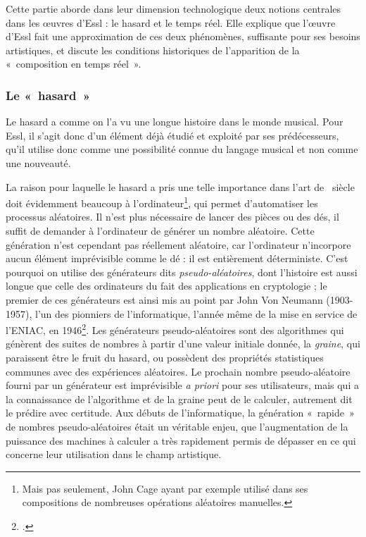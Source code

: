 \documentclass[a4paper,12pt]{article}
\newcommand{\guill}[1]{«~#1~»}
\begin{document}
Cette partie aborde dans leur dimension technologique deux notions centrales dans les œuvres d'Essl : le hasard et le temps réel. Elle explique que l'œuvre d'Essl fait une approximation de ces deux phénomènes, suffisante pour ses besoins artistiques, et discute les conditions historiques de l'apparition de la \guill{composition en temps réel}.

\subsubsection{Le \guill{hasard}}
\label{hasard}

Le hasard a comme on l'a vu une longue histoire dans le monde musical. Pour Essl, il s'agit donc d'un élément déjà étudié et exploité par ses prédécesseurs, qu'il utilise donc comme une possibilité connue du langage musical et non comme une nouveauté.

La raison pour laquelle le hasard a pris une telle importance dans l'art de \XXe~siècle doit évidemment beaucoup à l'ordinateur\footnote{Mais pas seulement, John Cage ayant par exemple utilisé dans ses compositions de nombreuses opérations aléatoires manuelles.}, qui permet d'automatiser les processus aléatoires. Il n'est plus nécessaire de lancer des pièces ou des dés, il suffit de demander à l'ordinateur de générer un nombre aléatoire. Cette génération n'est cependant pas réellement aléatoire, car l'ordinateur n'incorpore aucun élément imprévisible comme le dé : il est entièrement déterministe. C'est pourquoi on utilise des générateurs dits \emph{pseudo-aléatoires}, dont l'histoire est aussi longue que celle des ordinateurs du fait des applications en cryptologie ; le premier de ces générateurs est ainsi mis au point par John Von Neumann (1903-1957), l'un des pionniers de l'informatique, l'année même de la mise en service de l'ENIAC, en 1946\footcite{von195113}. Les générateurs pseudo-aléatoires sont des algorithmes qui génèrent des suites de nombres à partir d'une valeur initiale donnée, la \emph{graine}, qui paraissent être le fruit du hasard, ou possèdent des propriétés statistiques communes avec des expériences aléatoires. Le prochain nombre pseudo-aléatoire fourni par un générateur est imprévisible \emph{a priori} pour ses utilisateurs, mais qui a la connaissance de l'algorithme et de la graine peut de le calculer, autrement dit le prédire avec certitude. Aux débuts de l'informatique, la génération \guill{rapide} de nombres pseudo-aléatoires était un véritable enjeu, que l'augmentation de la puissance des machines à calculer a très rapidement permis de dépasser en ce qui concerne leur utilisation dans le champ artistique.
\end{document}
